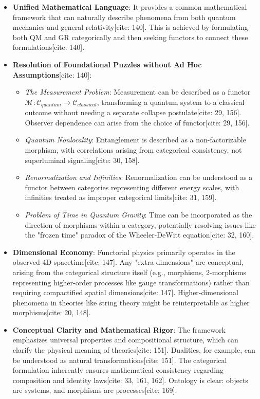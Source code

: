 \documentclass[11pt,a4paper]{article}
\begin{document}
\begin{itemize}
    \item \textbf{Unified Mathematical Language}: It provides a common mathematical framework that can naturally describe phenomena from both quantum mechanics and general relativity[cite: 140]. This is achieved by formulating both QM and GR categorically and then seeking functors to connect these formulations[cite: 140].

    \item \textbf{Resolution of Foundational Puzzles without Ad Hoc Assumptions}[cite: 140]:
    \begin{itemize}
        \item \textit{The Measurement Problem}: Measurement can be described as a functor $\mathcal{M}:\mathcal{C}_{quantum}\rightarrow\mathcal{C}_{classical}$, transforming a quantum system to a classical outcome without needing a separate collapse postulate[cite: 29, 156]. Observer dependence can arise from the choice of functor[cite: 29, 156].
        \item \textit{Quantum Nonlocality}: Entanglement is described as a non-factorizable morphism, with correlations arising from categorical consistency, not superluminal signaling[cite: 30, 158].
        \item \textit{Renormalization and Infinities}: Renormalization can be understood as a functor between categories representing different energy scales, with infinities treated as improper categorical limits[cite: 31, 159].
        \item \textit{Problem of Time in Quantum Gravity}: Time can be incorporated as the direction of morphisms within a category, potentially resolving issues like the "frozen time" paradox of the Wheeler-DeWitt equation[cite: 32, 160].
    \end{itemize}

    \item \textbf{Dimensional Economy}: Functorial physics primarily operates in the observed 4D spacetime[cite: 147]. Any "extra dimensions" are conceptual, arising from the categorical structure itself (e.g., morphisms, 2-morphisms representing higher-order processes like gauge transformations) rather than requiring compactified spatial dimensions[cite: 147]. Higher-dimensional phenomena in theories like string theory might be reinterpretable as higher morphisms[cite: 20, 148].

    \item \textbf{Conceptual Clarity and Mathematical Rigor}: The framework emphasizes universal properties and compositional structure, which can clarify the physical meaning of theories[cite: 151]. Dualities, for example, can be understood as natural transformations[cite: 151]. The categorical formulation inherently ensures mathematical consistency regarding composition and identity laws[cite: 33, 161, 162]. Ontology is clear: objects are systems, and morphisms are processes[cite: 169].


\end{itemize}
\end{document}
